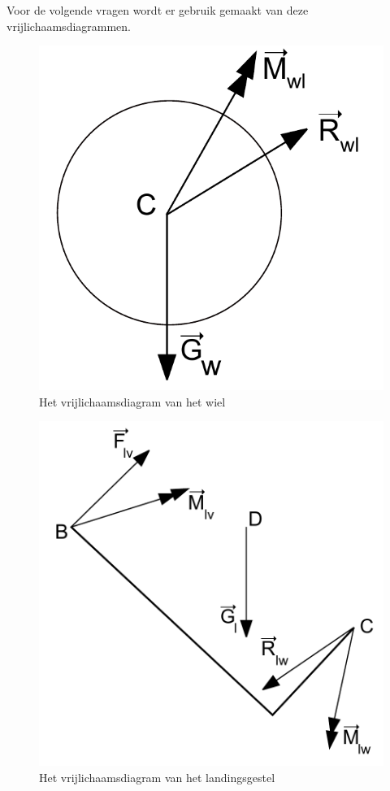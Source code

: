 Voor de volgende vragen wordt er gebruik gemaakt van deze vrijlichaamsdiagrammen.

\begin{figure}[H]
\centering
\includegraphics[scale=0.5]{Vrijlichaamsdiagram_wiel}
\caption{Het vrijlichaamsdiagram van het wiel}
\end{figure}

\begin{figure}[H]
\centering
\includegraphics[scale=0.5]{Vrijlichaamsdiagram_landing}
\caption{Het vrijlichaamsdiagram van het landingsgestel}
\end{figure}